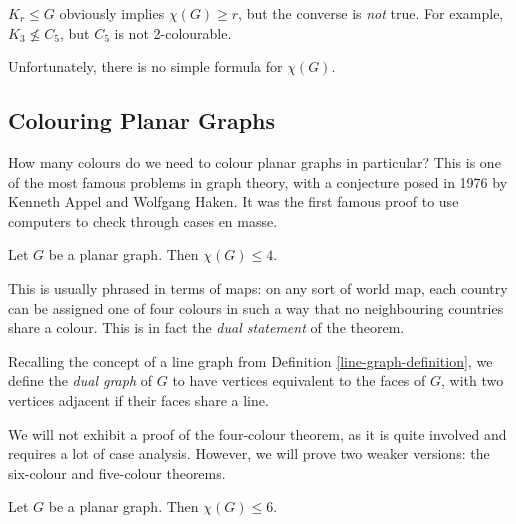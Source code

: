 \documentclass{article}
\begin{document}
\begin{note}
	$K_r \leq G$ obviously implies $\chi(G) \geq r$, but the converse is \textit{not} true. For example, $K_3 \not\leq C_5$, but $C_5$ is not 2-colourable.
\end{note}

\begin{note}
	Unfortunately, there is no simple formula for $\chi(G)$.
\end{note}


\subsection{Colouring Planar Graphs}

How many colours do we need to colour planar graphs in particular? This is one of the most famous problems in graph theory, with a conjecture posed in 1976 by Kenneth Appel and Wolfgang Haken. It was the first famous proof to use computers to check through cases en masse.

\begin{theorem}
    \label{4-colour-theorem}
	Let $G$ be a planar graph. Then $\chi(G) \leq 4$.
\end{theorem}

This is usually phrased in terms of maps: on any sort of world map, each country can be assigned one of four colours in such a way that no neighbouring countries share a colour. This is in fact the \textit{dual statement} of the theorem.

\begin{definition}
    Recalling the concept of a line graph from Definition \ref{line-graph-definition}, we define the \textit{dual graph} of $G$ to have vertices equivalent to the faces of $G$, with two vertices adjacent if their faces share a line.
\end{definition}

We will not exhibit a proof of the four-colour theorem, as it is quite involved and requires a lot of case analysis. However, we will prove two weaker versions: the six-colour and five-colour theorems.

\begin{theorem}
    \label{6-colour-theorem}
	Let $G$ be a planar graph. Then $\chi(G) \leq 6$.
\end{theorem}
\end{document}

